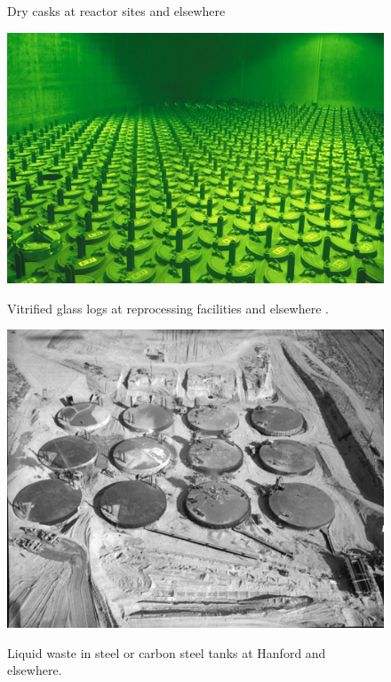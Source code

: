 \begin{figure}[htbp!]
\begin{center}
\begin{minipage}[t]{0.45\textwidth}
      \caption{Dry casks at reactor sites and elsewhere \cite{casks}}
        \label{fig:casks}
    \end{minipage}
    \hspace{0.01\textwidth}
    \begin{minipage}[t]{0.45\textwidth}
      \includegraphics{logs.eps}
        \caption{Vitrified glass logs at reprocessing facilities and elsewhere 
          \cite{logs}.}
        \label{fig:logs}
      \includegraphics{tanks.eps}
        \caption{Liquid waste in steel or carbon steel tanks at Hanford and 
          elsewhere\cite{tanks}.}
        \label{fig:tanks}
    \end{minipage}
    \end{center}
  \end{figure}
